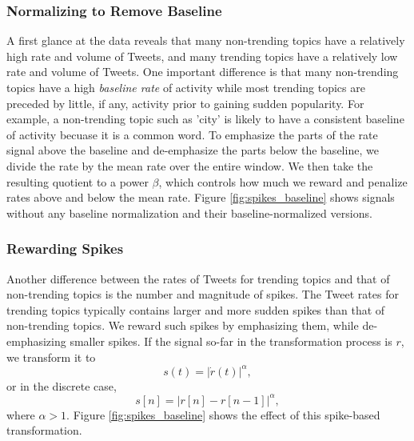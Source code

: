 \subsubsection{Normalizing to Remove Baseline}
A first glance at the data reveals that many non-trending
topics have a relatively high rate and volume of Tweets, and many trending
topics have a relatively low rate and volume of Tweets. One important difference
is that many non-trending topics have a high {\em baseline rate} of activity
while most trending topics are preceded by little, if any, activity prior to
gaining sudden popularity. For example, a non-trending topic such as 'city' is
likely to have a consistent baseline of activity becuase it is a common word. To
emphasize the parts of the rate signal above the baseline and de-emphasize the
parts below the baseline, we divide the rate by the mean rate over the entire
window. We then take the resulting quotient to a power $\beta$, which controls
how much we reward and penalize rates above and below the mean rate. Figure
\ref{fig:spikes_baseline} shows signals without any baseline normalization and
their baseline-normalized versions.

\subsubsection{Rewarding Spikes}
Another difference between the rates of Tweets for trending topics and that of
non-trending topics is the number and magnitude of spikes. The Tweet rates for
trending topics typically contains larger and more sudden spikes than that of
non-trending topics. We reward such spikes by emphasizing them, while
de-emphasizing smaller spikes. If the signal so-far in the transformation
process is $r$, we transform it to \[ s(t) = |\dot{r}(t)|^{\alpha},\] or in the
discrete case, \[ s[n] = |r[n] - r[n-1]|^{\alpha},\] where $\alpha > 1$. Figure
\ref{fig:spikes_baseline} shows the effect of this spike-based transformation.

